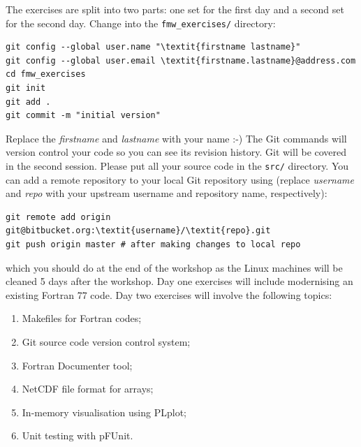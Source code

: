 \documentclass[12pt]{article}
\begin{document}
The exercises are split into two parts: one set for the first day and a second
set for the second day. Change into the \texttt{fmw\_exercises/} directory:
\begin{Verbatim}[commandchars=\\\{\}]
git config --global user.name "\textit{firstname lastname}"
git config --global user.email \textit{firstname.lastname}@address.com
cd fmw_exercises
git init
git add .
git commit -m "initial version"
\end{Verbatim}
Replace the \textit{firstname} and \textit{lastname} with your name :-) The Git commands
will version control your code so you can see its revision history. Git will
be covered in the second session. Please put all your source code in the \texttt{src/}
directory. You can add a remote repository to your local Git repository using (replace \textit{username} and \textit{repo}
with your upstream username and repository name, respectively):
\begin{Verbatim}[commandchars=\\\{\}]
git remote add origin git@bitbucket.org:\textit{username}/\textit{repo}.git
git push origin master # after making changes to local repo
\end{Verbatim}
which you should do at the end of the workshop as the Linux machines will be cleaned 5 days after the workshop.
Day one exercises will include modernising an existing Fortran 77 code. Day two exercises will involve the 
following topics:
\begin{enumerate}
\item Makefiles for Fortran codes;
\item Git source code version control system;
\item Fortran Documenter tool;
\item NetCDF file format for arrays;
\item In-memory visualisation using PLplot;
\item Unit testing with pFUnit.
\end{enumerate}
\newpage
\end{document}
